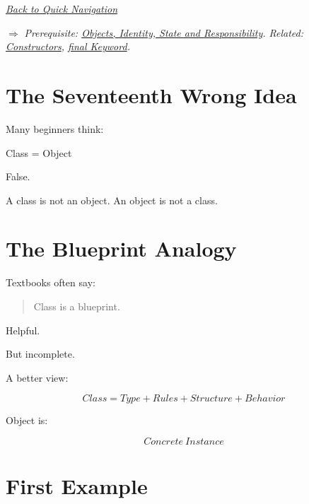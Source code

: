 \documentclass[11pt,a4paper]{book}
\begin{document}
\smallskip
\noindent
\hyperref[sec:quick_nav]{\emph{Back to Quick Navigation}}

\smallskip
\noindent
\textcolor{RosettaRoyalPurple}{$\Rightarrow$}
\emph{Prerequisite: \hyperref[chap:objects_identity]{Objects, Identity, State and Responsibility}. Related: \hyperref[chap:constructors]{Constructors}, \hyperref[chap:class_vs_object]{final Keyword}.}


\section{The Seventeenth Wrong Idea}

\begin{trap}

Many beginners think:

Class = Object

False.

A class is not an object.
An object is not a class.

\end{trap}


\section{The Blueprint Analogy}

Textbooks often say:

\begin{quote}
Class is a blueprint.
\end{quote}

Helpful.

But incomplete.


A better view:

\[
Class = Type + Rules + Structure + Behavior
\]


Object is:

\[
Concrete\ Instance
\]


\section{First Example}
\end{document}
